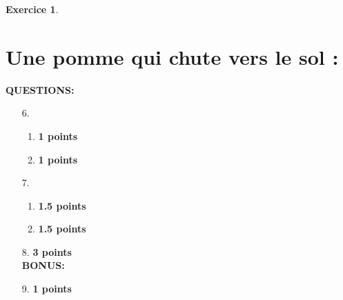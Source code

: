 \documentclass[a4paper,10.9pt]{article}
\theoremstyle{definition}
\newtheorem{exo}{Exercice}
\begin{document}
\begin{exo}
\section*{Une pomme qui chute vers le sol :}

\textbf{QUESTIONS:}\\
\begin{enumerate}
	\item[6.] 
	\begin{enumerate}
		\item \textbf{1 points} \\
		\item \textbf{1 points} \\
	\end{enumerate} 
	\item[7.]  
	\begin{enumerate}
		\item \textbf{1.5 points} \\
	
		\item  \textbf{1.5 points} \\
	\end{enumerate}
	\item[8.] \textbf{3 points} \\
	
	\textbf{BONUS:}\\
	\item[9.]  \textbf{1 points} \\
	
	
\end{enumerate}


\end{exo}
\end{document}

